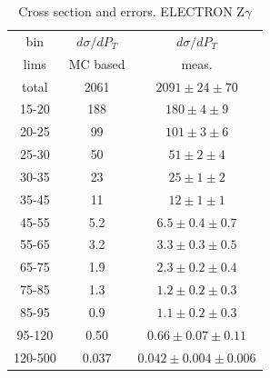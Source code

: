 \begin{table}[h]
  \scriptsize
  \begin{center}
  \caption{Cross section and errors. ELECTRON Z$\gamma$}
  \begin{tabular}{|c|c|c|}
    bin & $d\sigma/dP_{T}$ &$d\sigma/dP_{T}$ \\ 
    lims & MC based &    meas.       \\ \hline
    total & 2061 & $2091 \pm 24 \pm 70$ \\ \hline
    15-20 & 188 & $180 \pm 4 \pm 9$ \\ \hline
    20-25 & 99 & $101 \pm 3 \pm 6$ \\ \hline
    25-30 & 50 & $51 \pm 2 \pm 4$ \\ \hline
    30-35 & 23 & $25 \pm 1 \pm 2$ \\ \hline
    35-45 & 11 & $12 \pm 1 \pm 1$ \\ \hline
    45-55 & 5.2 & $6.5 \pm 0.4 \pm 0.7$ \\ \hline
    55-65 & 3.2 & $3.3 \pm 0.3 \pm 0.5$ \\ \hline
    65-75 & 1.9 & $2.3 \pm 0.2 \pm 0.4$ \\ \hline
    75-85 & 1.3 & $1.2 \pm 0.2 \pm 0.3$ \\ \hline
    85-95 & 0.9 & $1.1 \pm 0.2 \pm 0.3$ \\ \hline
    95-120 & 0.50 & $0.66 \pm 0.07 \pm 0.11$ \\ \hline
    120-500 & 0.037 & $0.042 \pm 0.004 \pm 0.006$ \\ \hline
  \end{tabular}
  \label{tab:sc_mc_vs_meas_ELECTRON_ZGamma}
  \end{center}
\end{table}

